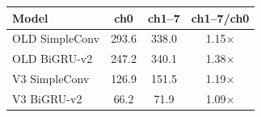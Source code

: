 \begin{tabular}{lccc}
\toprule
Model & ch0 & ch1--7 & ch1--7/ch0 \\
\midrule
OLD SimpleConv & 293.6 & 338.0 & 1.15$\times$ \\
OLD BiGRU-v2 & 247.2 & 340.1 & 1.38$\times$ \\
V3 SimpleConv & 126.9 & 151.5 & 1.19$\times$ \\
V3 BiGRU-v2 & 66.2 & 71.9 & 1.09$\times$ \\
\bottomrule
\end{tabular}
